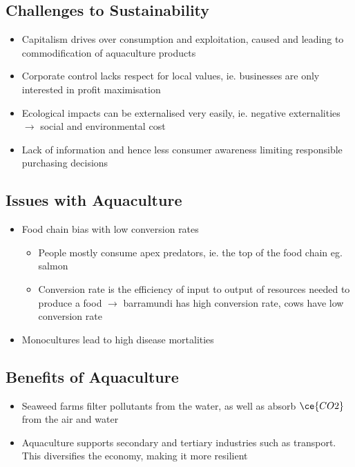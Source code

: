 	\subsection{Challenges to Sustainability}
		\begin{itemize}
			\item Capitalism drives over consumption and exploitation, caused and leading to commodification of aquaculture products
			\item Corporate control lacks respect for local values, ie. businesses are only interested in profit maximisation
			\item Ecological impacts can be externalised very easily, ie. negative externalities $\rightarrow$ social and environmental cost
			\item Lack of information and hence less consumer awareness limiting responsible purchasing decisions
		\end{itemize}

	\subsection{Issues with Aquaculture}
	\begin{itemize}
		\item Food chain bias with low conversion rates
			\begin{itemize}
				\item People mostly consume apex predators, ie. the top of the food chain eg. salmon
				\item Conversion rate is the efficiency of input to output of resources needed to produce a food $\rightarrow$ barramundi has high conversion rate, cows have low conversion rate
			\end{itemize}
		\item Monocultures lead to high disease mortalities
	\end{itemize}

	\subsection{Benefits of Aquaculture}
		\begin{itemize}
			\item Seaweed farms filter pollutants from the water, as well as absorb $\ce{CO2}$ from the air and water
			\item Aquaculture supports secondary and tertiary industries such as transport. This diversifies the economy, making it more resilient
		\end{itemize}

